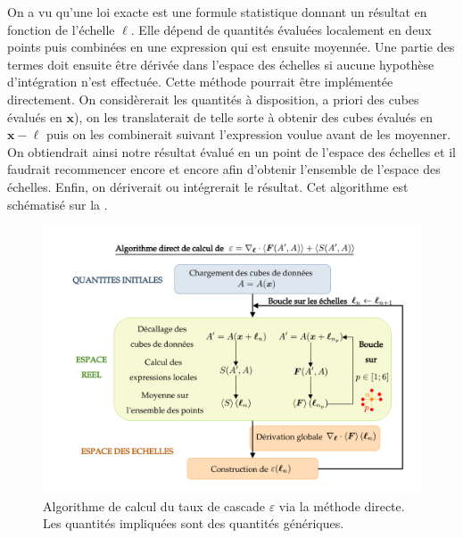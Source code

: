 On a vu qu'une loi exacte est une formule statistique donnant un résultat en fonction de l'échelle $\boldsymbol{\ell}$. Elle dépend de quantités évaluées localement en deux points puis combinées en une expression qui est ensuite moyennée. Une partie des termes doit ensuite être dérivée dans l'espace des échelles si aucune hypothèse d'intégration n'est effectuée. Cette méthode pourrait être implémentée directement. On considèrerait les quantités à disposition, a priori des cubes évalués en $\boldsymbol{x}$), on les translaterait de telle sorte à obtenir des cubes évalués en $\boldsymbol{x} - \boldsymbol{\ell}$ puis on les combinerait suivant l'expression voulue avant de les moyenner. On obtiendrait ainsi notre résultat évalué en un point de l'espace des échelles et il faudrait recommencer encore et encore afin d'obtenir l'ensemble de l'espace des échelles. Enfin, on dériverait ou intégrerait le résultat. Cet algorithme est schématisé sur la .
\begin{figure}[!ht]
 \centering
\includegraphics[width=0.9\linewidth,trim=2cm 1cm 1cm 1cm, clip=true]{./Part_3/images_ch1/code_EL_direct}
\cprotect\caption{Algorithme de calcul du taux de cascade $\varepsilon$ via la méthode directe. Les quantités impliquées sont des quantités génériques.}
\label{fig:algo_direct}
\end{figure}

